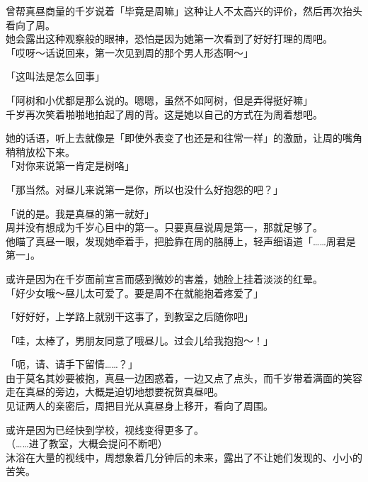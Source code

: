 曾帮真昼商量的千岁说着「毕竟是周嘛」这种让人不太高兴的评价，然后再次抬头看向了周。\\

她会露出这种观察般的眼神，恐怕是因为她第一次看到了好好打理的周吧。\\

「哎呀～话说回来，第一次见到周的那个男人形态啊～」

「这叫法是怎么回事」

「阿树和小优都是那么说的。嗯嗯，虽然不如阿树，但是弄得挺好嘛」\\

千岁再次笑着啪啪地拍起了周的背。这是她以自己的方式在为周着想吧。

她的话语，听上去就像是「即使外表变了也还是和往常一样」的激励，让周的嘴角稍稍放松下来。\\

「对你来说第一肯定是树咯」

「那当然。对昼儿来说第一是你，所以也没什么好抱怨的吧？」

「说的是。我是真昼的第一就好」\\

周并没有想成为千岁心目中的第一。只要真昼说周是第一，那就足够了。\\

他瞄了真昼一眼，发现她牵着手，把脸靠在周的胳膊上，轻声细语道「……周君是第一」。

或许是因为在千岁面前宣言而感到微妙的害羞，她脸上挂着淡淡的红晕。\\

「好少女哦～昼儿太可爱了。要是周不在就能抱着疼爱了」

「好好好，上学路上就别干这事了，到教室之后随你吧」

「哇，太棒了，男朋友同意了哦昼儿。过会儿给我抱抱～！」

「呃，请、请手下留情……？」\\

由于莫名其妙要被抱，真昼一边困惑着，一边又点了点头，而千岁带着满面的笑容走在真昼的旁边，大概是迫切地想要祝贺真昼吧。\\

见证两人的亲密后，周把目光从真昼身上移开，看向了周围。

或许是因为已经快到学校，视线变得更多了。\\

（……进了教室，大概会提问不断吧）\\

沐浴在大量的视线中，周想象着几分钟后的未来，露出了不让她们发现的、小小的苦笑。

